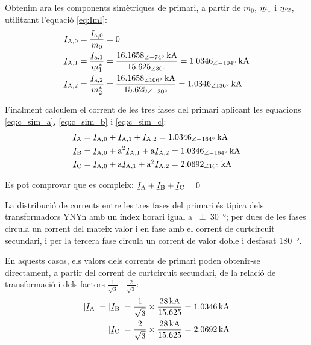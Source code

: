 \begin{exemple}
    Obtenim ara les components simètriques de primari, a partir de $m_0$, $\cmplx{m}_1$ i $\cmplx{m}_2$, utilitzant l'equació \eqref{eq:ImI}:
    \begin{align*}
        \cmplx{I}\ped{A,0} &= \frac{\cmplx{I}\ped{a,0}}{m_0} = 0 \\
        \cmplx{I}\ped{A,1} &= \frac{\cmplx{I}\ped{a,1}}{\cmplx{m}^*_1} = \frac{\qtypd{16,1658}{-74}{kA}}{\numpd{15,625}{30}} =  \qtypd{1,0346}{-104}{kA} \\
        \cmplx{I}\ped{A,2} &= \frac{\cmplx{I}\ped{a,2}}{\cmplx{m}^*_2} = \frac{\qtypd{16,1658}{106}{kA}}{\numpd{15,625}{-30}} = \qtypd{1,0346}{136}{kA}
    \end{align*}

    Finalment calculem el corrent de les tres fases del primari aplicant les equacions \eqref{eq:c_sim_a}, \eqref{eq:c_sim_b} i \eqref{eq:c_sim_c}:
     \begin{align*}
        \cmplx{I}\ped{A} &= \cmplx{I}\ped{A,0} + \cmplx{I}\ped{A,1} + \cmplx{I}\ped{A,2} = \qtypd{1,0346}{-164}{kA} \\
        \cmplx{I}\ped{B} &= \cmplx{I}\ped{A,0} + \au^2 \cmplx{I}\ped{A,1} + \au \cmplx{I}\ped{A,2} = \qtypd{1,0346}{-164}{kA} \\
        \cmplx{I}\ped{C} &= \cmplx{I}\ped{A,0} + \au \cmplx{I}\ped{A,1} + \au^2 \cmplx{I}\ped{A,2} = \qtypd{2,0692}{16}{kA}
    \end{align*}

    Es pot comprovar que es compleix: $\cmplx{I}\ped{A} + \cmplx{I}\ped{B} + \cmplx{I}\ped{C} = 0$

    La distribució de corrents entre les tres fases del primari és típica dels transformadors YNYn amb un índex horari igual a \qty{+-30}{\degree}; per dues de les fases circula un corrent del mateix valor  i en fase amb el corrent de curtcircuit secundari, i per la tercera fase circula un corrent de valor doble i desfasat \qty{180}{\degree}.

     En aquests casos, els valors dels corrents de primari poden obtenir-se directament, a partir del corrent de curtcircuit secundari, de la relació de transformació i dels factors $\frac{1}{\sqrt{3}}$ i  $\frac{2}{\sqrt{3}}$:
    \begin{align*}
        |\cmplx{I}\ped{A}| = |\cmplx{I}\ped{B}| = \frac{1}{\sqrt{3}} \times \frac{\qty{28}{kA}}{\num{15,625}} = \qty{1,0346}{kA} \\
        |\cmplx{I}\ped{C}|= \frac{2}{\sqrt{3}} \times \frac{\qty{28}{kA}}{\num{15,625}} = \qty{2,0692}{kA}
    \end{align*}

\end{exemple}




